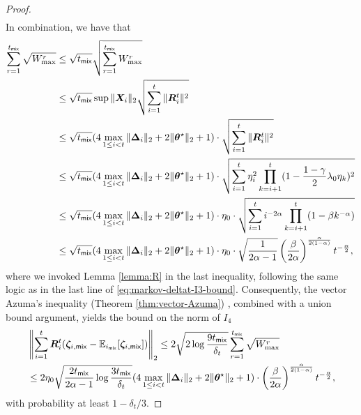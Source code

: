 \begin{proof}
\begin{align*}
\end{align*}
In combination, we have that
\begin{align*}
\sum_{r=1}^{t_{\mathsf{mix}}} \sqrt{W_{\max}^r} &\leq \sqrt{t_{\mathsf{mix}}} \sqrt{\sum_{r=1}^{t_{\mathsf{mix}}} W_{\max}^r} \\ 
&\leq \sqrt{t_{\mathsf{mix}}} \sup \|\bm{X}_i\|_2 \sqrt{\sum_{i=1}^t \|\bm{R}_i^t\|^2} \\ 
&\leq \sqrt{t_{\mathsf{mix}}} (4\max_{1 \leq i < t} \|\bm{\Delta}_i\|_2 + 2\|\bm{\theta}^\star\|_2  + 1)\cdot \sqrt{\sum_{i=1}^t \|\bm{R}_i^t\|^2} \\ 
&\leq \sqrt{t_{\mathsf{mix}}} (4\max_{1 \leq i < t} \|\bm{\Delta}_i\|_2 + 2\|\bm{\theta}^\star\|_2  + 1)\cdot \sqrt{\sum_{i=1}^t \eta_i^2 \prod_{k=i+1}^t (1-\frac{1-\gamma}{2}\lambda_0\eta_k)^2}\\
&\leq \sqrt{t_{\mathsf{mix}}} (4\max_{1 \leq i < t} \|\bm{\Delta}_i\|_2 + 2\|\bm{\theta}^\star\|_2  + 1)\cdot \eta_0 \cdot \sqrt{\sum_{i=1}^t i^{-2\alpha} \prod_{k=i+1}^t (1-\beta k^{-\alpha})}\\
&\leq \sqrt{t_{\mathsf{mix}}} (4\max_{1 \leq i < t} \|\bm{\Delta}_i\|_2 + 2\|\bm{\theta}^\star\|_2  + 1)\cdot \eta_0 \cdot \sqrt{\frac{1}{2\alpha-1}}\left(\frac{\beta}{2\alpha}\right)^{\frac{\alpha}{2(1-\alpha)}}t^{-\frac{\alpha}{2}},
\end{align*}
where we invoked Lemma \ref{lemma:R} in the last inequality, following the same logic as in the last line of \eqref{eq:markov-deltat-I3-bound}. %
Consequently, the vector Azuma's inequality (Theorem \ref{thm:vector-Azuma}) %
, combined with a union bound argument, yields the bound on the norm of $I_4$
\begin{align}\label{eq:markov-deltat-I4-bound}
&\left\|\sum_{i=1}^t \bm{R}_i^t (\bm{\zeta}_{i,\mathsf{mix}} - \mathbb{E}_{i_{\mathsf{mix}}}[\bm{\zeta}_{i,\mathsf{mix}}])\right\|_2\nonumber \leq 2\sqrt{2\log \frac{9t_{\mathsf{mix}}}{\delta_t}} \sum_{r=1}^{t_{\mathsf{mix}}} \sqrt{W_{\max}^r} \nonumber \\ 
&\leq 2 \eta_0 \sqrt{\frac{2t_{\mathsf{mix}}}{2\alpha-1}\log \frac{3t_{\mathsf{mix}}}{\delta_t}}(4\max_{1 \leq i < t} \|\bm{\Delta}_i\|_2 + 2\|\bm{\theta}^\star\|_2  + 1)\cdot \left(\frac{\beta}{2\alpha}\right)^{\frac{\alpha}{2(1-\alpha)}}t^{-\frac{\alpha}{2}},
\end{align}
with probability at least $1-\delta_t/3$. 

\end{proof}
